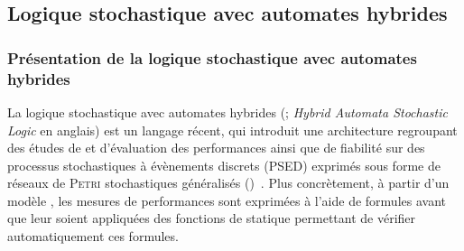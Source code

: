     \subsection{Logique stochastique avec automates hybrides}

        \subsubsection{Présentation de la logique stochastique avec automates hybrides}
La logique stochastique avec automates hybrides (\lsah; \textit{Hybrid Automata Stochastic Logic} en anglais) est un langage récent, qui introduit une architecture regroupant des études de \modelchecking et d'évaluation des performances ainsi que de fiabilité sur des processus stochastiques à évènements discrets (PSED) exprimés sous forme de réseaux de \textsc{Petri} stochastiques généralisés (\rpsg)~\cite{BDDHP11hasl}.
Plus concrètement, à partir d'un modèle \rpsg, les mesures de performances sont exprimées à l'aide de formules \lsah avant que leur soient appliquées des fonctions de \modelchecking statique permettant de vérifier automatiquement ces formules.

